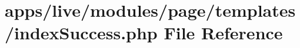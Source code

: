 \hypertarget{live_2modules_2page_2templates_2index_success_8php}{\section{apps/live/modules/page/templates/index\-Success.php File Reference}
\label{live_2modules_2page_2templates_2index_success_8php}
}

